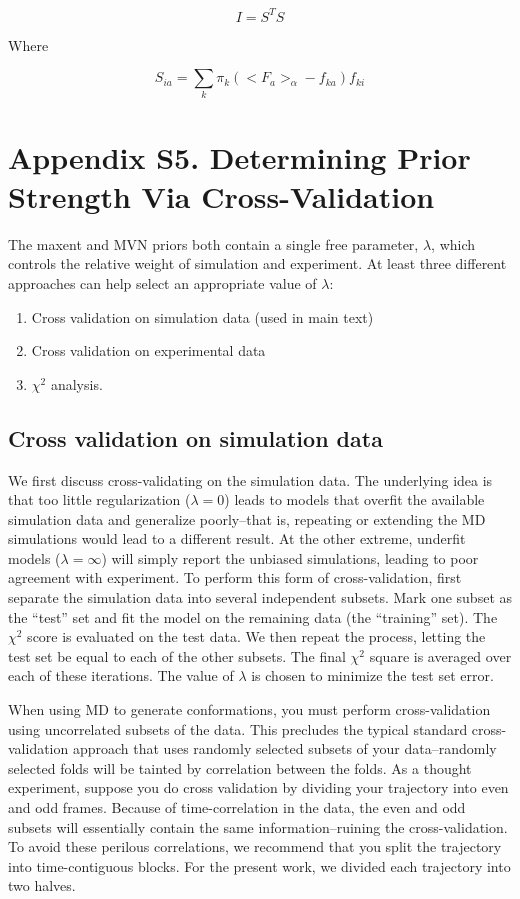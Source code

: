 \documentclass[journal=jacsat,manuscript=article]{achemso}
\begin{document}
$$I = S^T S$$

Where 

$$S_{ia} = \sum_k \pi_k (<F_a>_\alpha - f_{ka}) f_{ki}$$

\newpage

\section{Appendix S5.  Determining Prior Strength Via Cross-Validation}

The maxent and MVN priors both contain a single free parameter, $\lambda$, which controls the relative weight of simulation and experiment.  At least three different approaches can help select an appropriate value of $\lambda$:

\begin{enumerate}
 \item Cross validation on simulation data (used in main text)
 \item Cross validation on experimental data
 \item $\chi^2$ analysis.  
\end{enumerate}

\subsection{Cross validation on simulation data}

We first discuss cross-validating on the simulation data.  The underlying idea is that too little regularization ($\lambda = 0$) leads to models that overfit the available simulation data and generalize poorly--that is, repeating or extending the MD simulations would lead to a different result.  At the other extreme, underfit models ($\lambda = \infty$) will simply report the unbiased simulations, leading to poor agreement with experiment.  To perform this form of cross-validation, first separate the simulation data into several independent subsets.  Mark one subset as the ``test'' set and fit the model on the remaining data (the ``training'' set).  The $\chi^2$ score is evaluated on the test data.  We then repeat the process, letting the test set be equal to each of the other subsets.  The final $\chi^2$ square is averaged over each of these iterations.  The value of $\lambda$ is chosen to minimize the test set error.

When using MD to generate conformations, you must perform cross-validation using uncorrelated subsets of the data.  This precludes the typical standard cross-validation approach that uses randomly selected subsets of your data--randomly selected folds will be tainted by correlation between the folds.  As a thought experiment, suppose you do cross validation by dividing your trajectory into even and odd frames.  Because of time-correlation in the data, the even and odd subsets will essentially contain the same information--ruining the cross-validation.  To avoid these perilous correlations, we recommend that you split the trajectory into time-contiguous blocks.  For the present work, we divided each trajectory into two halves.  
\end{document}
